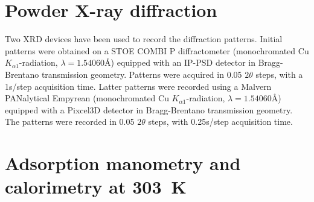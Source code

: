 \section{Powder X-ray diffraction}\label{appx:char:pxrd}

Two XRD devices have been used to record the diffraction patterns.
Initial patterns were obtained on a STOE COMBI P diffractometer 
(monochromated Cu \(K_{\alpha 1}\)-radiation, \(\lambda= 1.54060 \si{\angstrom} \)) 
equipped with an IP-PSD detector in Bragg-Brentano transmission geometry.
Patterns were acquired in 0.05 \(2\theta \) steps, with a 1s/step acquisition time.
Latter patterns were recorded using a Malvern PANalytical Empyrean 
(monochromated Cu \(K_{\alpha 1}\)-radiation, \(\lambda= 1.54060 \si{\angstrom} \))
equipped with a Pixcel3D detector in Bragg-Brentano transmission geometry.
The patterns were recorded in 0.05 \(2\theta \) steps, with 
0.25s/step acquisition time.

\section{Adsorption manometry and calorimetry at \SI{303}{\kelvin}}\label{appx:char:ambient-calo}


